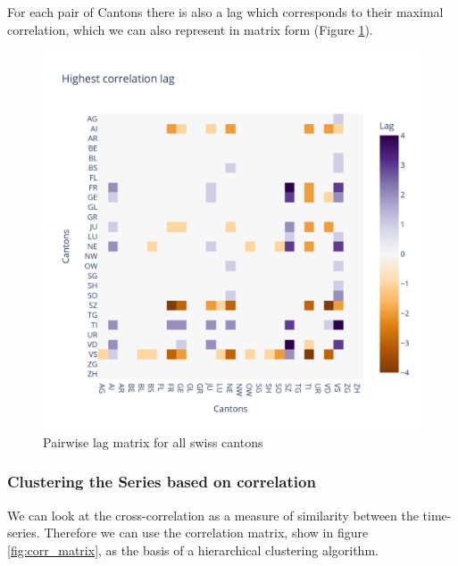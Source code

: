 \documentclass[11pt]{article}
\begin{document}
For each pair of Cantons there is also a lag which corresponds to their maximal correlation, which we can also represent in matrix form (Figure \ref{fig:lagmatrix}).

\begin{figure}
 \centering
 \includegraphics[width=\linewidth]{canton_lag_matrix.png}
 \caption{Pairwise lag matrix for all swiss cantons}
 \label{fig:lagmatrix}
\end{figure}

    
    
    \hypertarget{clustering-the-series-based-on-correlation}{%
\subsubsection{Clustering the Series based on correlation}\label{clustering-the-series-based-on-correlation}}

We can look at the cross-correlation as a measure of similarity between the time-series. Therefore we can use the correlation matrix, show in figure \ref{fig:corr_matrix}, as the basis of a hierarchical clustering algorithm.
\end{document}
